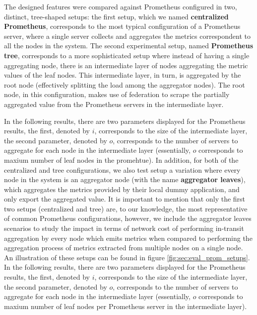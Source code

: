 The designed features were compared against Prometheus configured in two, distinct, tree-shaped setups: the first setup, which we named \textbf{centralized Prometheus}, corresponds to the most typical configuration of a Prometheus server, where a single server collects and aggregates the metrics correspondent to all the nodes in the system. The second experimental setup, named \textbf{Prometheus tree}, corresponds to a more sophisticated setup where instead of having a single aggregating node, there is an intermediate layer of nodes aggregating the metric values of the leaf nodes. This intermediate layer, in turn, is aggregated by the root node (effectively splitting the load among the aggregator nodes). The root node, in this configuration, makes use of federation to scrape the partially aggregated value from the Prometheus servers in the intermediate layer.

In the following results, there are two parameters displayed for the Prometheus results, the first, denoted by $i$, corresponds to the size of the intermediate layer, the second parameter, denoted by $o$, corresponds to the number of servers to aggregate for each node in the intermediate layer (essentially, $o$ corresponds to maxium number of leaf nodes in the promehtue). In addition, for both of the centralized and tree configurations, we also test setup a variation where every node in the system is an aggregator node (with the name \textbf{aggregator leaves}), which aggregates the metrics provided by their local dummy application, and only export the aggregated value. It is important to mention that only the first two setups (centralized and tree) are, to our knowledge, the most representative of common Prometheus configurations, however, we include the aggregator leaves scenarios to study the impact in terms of network cost of performing in-transit aggregation by every node which emits metrics when compared to performing the aggregation process of metrics extracted from multiple nodes on a single node. An illustration of these setups can be found in figure \ref{fig:sec:eval_prom_setups}.
In the following results, there are two parameters displayed for the Prometheus results, the first, denoted by $i$, corresponds to the size of the intermediate layer, the second parameter, denoted by $o$, corresponds to the number of servers to aggregate for each node in the intermediate layer (essentially, $o$ corresponds to maxium number of leaf nodes per  Prometheus server in the intermediate layer).

